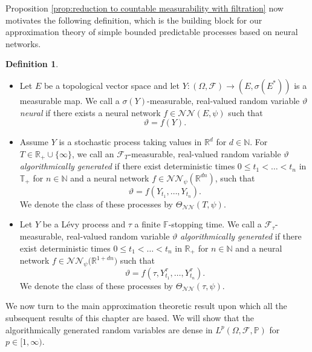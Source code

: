 \documentclass[11pt,a4paper,twoside,openany]{report}
\numberwithin{equation}{section}
\theoremstyle{plain} %
\theoremstyle{definition} %
\newtheorem{definition}[theorem]{Definition}
\theoremstyle{remark} %
\begin{document}
Proposition \ref{prop:reduction to countable measurability with filtration} now motivates the following definition, which is the building block for our approximation theory of simple bounded predictable processes based on neural networks. 
\begin{definition}\label{def:algorithmic strategies}
    \begin{itemize}
        \item Let \(E\) be a topological vector space and let \(Y:(\Omega,\mathcal{F})\to(E,\sigma(E^*))\) is a measurable map. We call a \(\sigma(Y)\)-measurable, real-valued random variable \(\vartheta\) \textit{neural} if there exists a neural network \(f\in\mathcal{NN}(E,\psi)\) such that 
        \begin{equation*}
            \vartheta = f(Y).
        \end{equation*}
        \item Assume \(Y\) is a stochastic process taking values in \(\mathbb{R}^d\) for \(d\in\mathbb{N}\). For \(T\in\mathbb{R}_+\cup\{\infty\}\), we call an \(\mathcal{F}_T\)-measurable, real-valued random variable \(\vartheta\) \textit{algorithmically generated} if there exist deterministic times 
        \(0\leq t_1<\dots<t_n\) in \(\mathbb{T}_+\) for \(n\in\mathbb{N}\) and a neural network \(f\in\mathcal{NN}_\psi(\mathbb{R}^{dn})\), such that
        \begin{equation*}
            \vartheta = f(Y_{t_1},\dots,Y_{t_n}).
        \end{equation*}
        We denote the class of these processes by \(\Theta_{\mathcal{NN}}(T,\psi)\). 
        \item
        Let \(Y\) be a Lévy process and \(\tau\) a finite \(\mathbb{F}\)-stopping time. We call a \(\mathcal{F}_{\tau}\)-measurable, real-valued random variable \(\vartheta\) \textit{algorithmically generated} if there exist deterministic times 
        \(0\leq t_1<\dots<t_n\) in \(\mathbb{R}_+\) for \(n\in\mathbb{N}\) and a neural network \(f\in\mathcal{NN}_\psi\big(\mathbb{R}^{1+dn}\big)\) such that
        \begin{equation*}
            \vartheta = f(\tau,Y^{\tau}_{t_1},\dots,Y^{\tau}_{t_n}).
        \end{equation*}
        We denote the class of these processes by \(\Theta_{\mathcal{NN}}(\tau,\psi)\). 
    \end{itemize}
\end{definition}
We now turn to the main approximation theoretic result upon which all the subsequent results of this chapter are based. We will show that the algorithmically generated random variables are dense in \(L^p(\Omega,\mathcal{F},\mathbb{P})\) for \(p\in[1,\infty)\).
\end{document}
